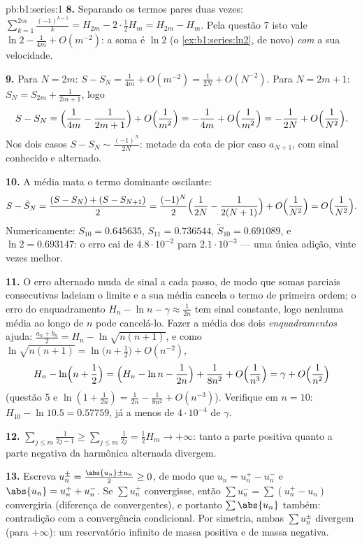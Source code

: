 \begin{solution}{pb:b1:series:1}
\textbf{8.} Separando os termos pares duas vezes:
$\sum_{k=1}^{2m}\frac{(-1)^{k-1}}{k} = H_{2m} - 2\cdot\frac12
H_m = H_{2m} - H_m$. Pela questão 7 isto vale $\ln 2 -
\frac{1}{4m} + O(m^{-2})$: a soma é $\ln 2$
(o \cref{ex:b1:series:ln2}, de novo) \emph{com} a sua velocidade.

\textbf{9.} Para $N = 2m$: $S - S_N = \frac{1}{4m} + O(m^{-2}) =
\frac{1}{2N} + O(N^{-2})$. Para $N = 2m + 1$: $S_{N} = S_{2m} +
\frac{1}{2m+1}$, logo
\[
S - S_N = \Bigl(\frac{1}{4m} - \frac{1}{2m+1}\Bigr) +
O\Bigl(\frac{1}{m^2}\Bigr)
= -\frac{1}{4m} + O\Bigl(\frac{1}{m^2}\Bigr)
= -\frac{1}{2N} + O\Bigl(\frac{1}{N^2}\Bigr).
\]
Nos dois casos $S - S_N \sim \frac{(-1)^N}{2N}$: metade da
cota de pior caso $a_{N+1}$, com sinal conhecido e alternado.

\textbf{10.} A média mata o termo dominante oscilante:
\[
S - \tilde S_N = \frac{(S - S_N) + (S - S_{N+1})}{2}
= \frac{(-1)^N}{2}\Bigl(\frac{1}{2N} - \frac{1}{2(N+1)}\Bigr)
+ O\Bigl(\frac{1}{N^2}\Bigr) = O\Bigl(\frac{1}{N^2}\Bigr).
\]
Numericamente: $S_{10} = 0.645635$, $S_{11} = 0.736544$, $\tilde
S_{10} = 0.691089$, e $\ln 2 = 0.693147$: o erro cai de
$4.8\cdot10^{-2}$ para $2.1\cdot10^{-3}$ --- uma única adição, vinte
vezes melhor.

\textbf{11.} O erro alternado muda de sinal a cada passo,
de modo que somas parciais consecutivas ladeiam o limite e a sua
média cancela o termo de primeira ordem; o erro do enquadramento
$H_n - \ln n -
\gamma \approx \frac{1}{2n}$ tem sinal constante, logo nenhuma média
ao longo de $n$ pode cancelá-lo. Fazer a média dos dois
\emph{enquadramentos} ajuda: $\frac{a_n + b_n}{2} = H_n - \ln\sqrt{n(n+1)}$, e como
$\ln\sqrt{n(n+1)} = \ln\bigl(n + \frac12\bigr) + O(n^{-2})$,
\[
H_n - \ln\Bigl(n + \frac12\Bigr)
= \Bigl(H_n - \ln n - \frac{1}{2n}\Bigr) + \frac{1}{8n^2} +
O\Bigl(\frac{1}{n^3}\Bigr) = \gamma + O\Bigl(\frac{1}{n^2}\Bigr)
\]
(questão 5 e $\ln(1 + \frac{1}{2n}) = \frac{1}{2n} -
\frac{1}{8n^2} + O(n^{-3})$). Verifique em $n = 10$: $H_{10} -
\ln 10.5 = 0.57759$, já a menos de
$4\cdot10^{-4}$ de $\gamma$.

\textbf{12.} $\sum_{j\leq m} \frac{1}{2j-1} \geq \sum_{j \leq m}
\frac{1}{2j} = \frac12 H_m \to +\infty$: tanto a parte positiva quanto
a parte negativa da  harmônica alternada divergem.

\textbf{13.} Escreva $u_n^\pm = \frac{\abs{u_n} \pm u_n}{2} \geq
0$, de modo que $u_n = u_n^+ - u_n^-$ e $\abs{u_n} = u_n^+ + u_n^-$. Se
$\sum u_n^+$ convergisse, então $\sum u_n^- = \sum (u_n^+ - u_n)$
convergiria (diferença de  convergentes), e portanto $\sum
\abs{u_n}$
também: contradição com a convergência condicional. Por
simetria, ambas $\sum u_n^\pm$ divergem (para $+\infty$): um reservatório
infinito de massa positiva e de massa negativa.


\end{solution}

